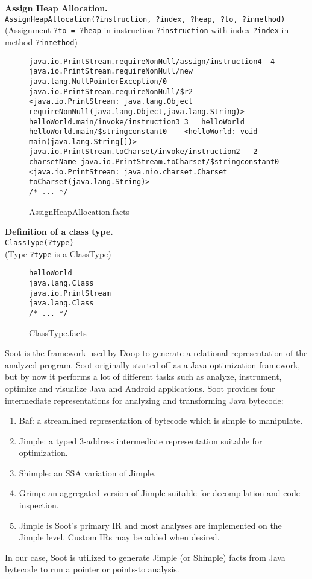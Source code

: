 \documentclass{dithesis}
\begin{document}
        \textbf{Assign Heap Allocation.}\\
        \texttt{AssignHeapAllocation(?instruction, ?index, ?heap, ?to, ?inmethod)}\\
        (Assignment \texttt{?to = ?heap} in instruction \texttt{?instruction} with index \texttt{?index} in method \texttt{?inmethod})
        \begin{figure}[H]
\begin{lstlisting}
java.io.PrintStream.requireNonNull/assign/instruction4  4   java.io.PrintStream.requireNonNull/new java.lang.NullPointerException/0 java.io.PrintStream.requireNonNull/$r2  <java.io.PrintStream: java.lang.Object requireNonNull(java.lang.Object,java.lang.String)>
helloWorld.main/invoke/instruction3 3   helloWorld  helloWorld.main/$stringconstant0    <helloWorld: void main(java.lang.String[])>
java.io.PrintStream.toCharset/invoke/instruction2   2   charsetName java.io.PrintStream.toCharset/$stringconstant0  <java.io.PrintStream: java.nio.charset.Charset toCharset(java.lang.String)>
/* ... */
\end{lstlisting}
\caption{AssignHeapAllocation.facts}
        \end{figure}


        \textbf{Definition of a class type.}\\
        \texttt{ClassType(?type)}\\
        (Type \texttt{?type} is a ClassType)
        \begin{figure}[H]
\begin{lstlisting}
helloWorld
java.lang.Class
java.io.PrintStream
java.lang.Class
/* ... */
\end{lstlisting}
\caption{ClassType.facts}
        \end{figure}


    Soot \cite{Sable: Soot} is the framework used by Doop to generate a relational representation of the analyzed program. Soot originally started off as a Java optimization framework, but by now it performs a lot of different tasks such as analyze, instrument, optimize and visualize Java and Android applications. Soot provides four intermediate representations for analyzing and transforming Java bytecode:
	\begin{enumerate}
		\item Baf: a streamlined representation of bytecode which is simple to manipulate.
		\item Jimple: a typed 3-address intermediate representation suitable for optimization.
		\item Shimple: an SSA variation of Jimple.
		\item Grimp: an aggregated version of Jimple suitable for decompilation and code inspection.
		\item Jimple is Soot’s primary IR and most analyses are implemented on the Jimple level. Custom IRs may be added when desired.
	\end{enumerate}
    In our case, Soot is utilized to generate Jimple (or Shimple) facts from Java bytecode to run a pointer or points-to analysis.
    
\end{document}
